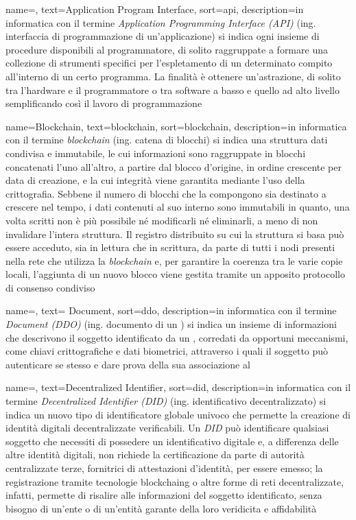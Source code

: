 {
    name=,
    text=Application Program Interface,
    sort=api,
    description={in informatica con il termine \emph{Application Programming Interface (API)} (ing. interfaccia di programmazione di un'applicazione) si indica ogni insieme di procedure disponibili al programmatore, di solito raggruppate a formare una collezione di strumenti specifici per l'espletamento di un determinato compito all'interno di un certo programma. La finalità è ottenere un'astrazione, di solito tra l'hardware e il programmatore o tra software a basso e quello ad alto livello semplificando così il lavoro di programmazione}
}

{
	name=Blockchain,
	text=blockchain,
	sort=blockchain,
	description={in informatica con il termine \emph{blockchain} (ing. catena di blocchi) si indica una struttura dati condivisa e immutabile, le cui informazioni sono raggruppate in blocchi concatenati l'uno all'altro, a partire dal blocco d'origine, in ordine crescente per data di creazione, e la cui integrità viene garantita mediante l'uso della crittografia. Sebbene il numero di blocchi che la compongono sia destinato a crescere nel tempo, i dati contenuti al suo interno sono immutabili in quanto, una volta scritti non è più possibile né modificarli né eliminarli, a meno di non invalidare l'intera struttura. Il registro distribuito su cui la struttura si basa può essere acceduto, sia in lettura che in scrittura, da parte di tutti i nodi presenti nella rete che utilizza la \emph{blockchain} e, per garantire la coerenza tra le varie copie locali, l'aggiunta di un nuovo blocco viene gestita tramite un apposito protocollo di consenso condiviso}
}

{
	name=,
	text= Document,
	sort=ddo,
	description={in informatica con il termine \emph{ Document (DDO)} (ing. documento di un ) si indica un insieme di informazioni che descrivono il soggetto identificato da un , corredati da opportuni meccanismi, come chiavi crittografiche e dati biometrici, attraverso i quali il soggetto può autenticare se stesso e dare prova della sua associazione al }
}

{
	name=,
	text=Decentralized Identifier,
	sort=did,
	description={in informatica con il termine \emph{Decentralized Identifier (DID)} (ing. identificativo decentralizzato) si indica un nuovo tipo di identificatore globale univoco che permette la creazione di identità digitali decentralizzate verificabili. Un \emph{DID} può identificare qualsiasi soggetto che necessiti di possedere un identificativo digitale e, a differenza delle altre identità digitali, non richiede la certificazione da parte di autorità centralizzate terze, fornitrici di attestazioni d'identità, per essere emesso; la registrazione tramite tecnologie \gls{blockchaing} o altre forme di reti decentralizzate, infatti, permette di risalire alle informazioni del soggetto identificato, senza bisogno di un'ente o di un'entità garante della loro veridicita e affidabilità}
}

